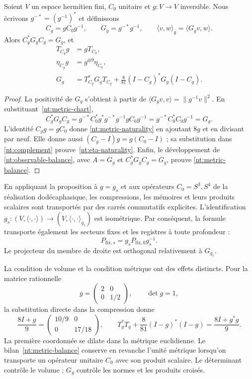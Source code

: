 \begin{proposition}
Soient \(V\) un espace hermitien fini, \(C_0\) unitaire et \(g:V\to V\) inversible. Nous écrivons \(g^{-*}=(g^{-1})^*\) et définissons
\begin{equation}
 C_g=gC_0g^{-1},\qquad
 G_g=g^{-*}g^{-1},\qquad
 \langle v,w\rangle_g=\langle G_gv,w\rangle.
 \label{nt:metric-chart}
\end{equation}
Alors \(C_g^*G_gC_g=G_g\), et
\begin{align}
 T_{C_g}g&=gT_{C_0},\label{nt:metric-naturality}\\
 \eta_{C_g}g&=g^{\oplus9}\eta_{C_0},\label{nt:eta-naturality}\\
 G_g&=T_{C_g}^*G_gT_{C_g}
 +\frac8{81}(I-C_g)^*G_g(I-C_g).\label{nt:metric-balance}
\end{align}
\end{proposition}

\begin{proof}
La positivité de \(G_g\) s’obtient à partir de
\(\langle G_gv,v\rangle=\|g^{-1}v\|^2\).
En substituant~\eqref{nt:metric-chart},
\[
 C_g^*G_gC_g
 =g^{-*}C_0^*g^*g^{-*}g^{-1}gC_0g^{-1}
 =g^{-*}C_0^*C_0g^{-1}=G_g.
\]
L’identité \(C_gg=gC_0\) donne
\eqref{nt:metric-naturality} en ajoutant \(8g\) et en divisant
par neuf. Elle donne aussi
\((C_g-I)g=g(C_0-I)\) ; sa substitution dans
\eqref{nt:complement} prouve~\eqref{nt:eta-naturality}.
Enfin, le développement de
\eqref{nt:observable-balance}, avec \(A=G_g\) et
\(C_g^*G_gC_g=G_g\), prouve
\eqref{nt:metric-balance}.
\end{proof}

En appliquant la proposition à \(g=g_s\) et aux opérateurs \(C_0=S^3,S^4\) de la réalisation dodécaphasique, les compressions, les mémoires et leurs produits scalaires sont transportés par des carrés commutatifs explicites. L'identification \(g_s:(V,\langle\cdot,\cdot\rangle)
\to(V,\langle\cdot,\cdot\rangle_{g_s})\) est isométrique. Par conséquent, la formule transporte également les secteurs fixes et les registres à toute profondeur :
\[
 P_{\mathrm{fix},s}
 =g_sP_{\mathrm{fix},0}g_s^{-1}.
\]
Le projecteur du membre de droite est orthogonal relativement
à \(G_{g_s}\).

La condition de volume et la condition métrique ont
des effets distincts. Pour la matrice rationnelle
\[
 g=\begin{pmatrix}2&0\\0&1/2\end{pmatrix},
 \qquad \det g=1,
\]
la substitution directe dans la compression donne
\[
 \frac{8I+g}{9}
 =\begin{pmatrix}10/9&0\\0&17/18\end{pmatrix},
 \qquad
 T_g^*T_g+\frac8{81}(I-g)^*(I-g)
 =\frac{8I+g^*g}{9}.
\]
La première coordonnée se dilate dans la métrique
euclidienne. Le bilan~\eqref{nt:metric-balance}
conserve en revanche l’unité métrique lorsqu’on
transporte un opérateur unitaire \(C_0\) avec
son produit scalaire. Le déterminant contrôle
le volume ; \(G_g\) contrôle les normes et les
produits croisés.

